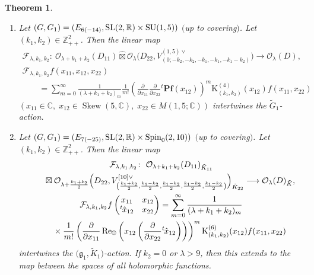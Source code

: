 \documentclass[pdftex]{sigma}
\numberwithin{equation}{section}
\newtheorem{Theorem}{Theorem}[section]
\newcommand{\BZ}{\mathbb{Z}}
\newcommand{\BR}{\mathbb{R}}
\newcommand{\BC}{\mathbb{C}}
\newcommand{\BO}{\mathbb{O}}
\newcommand{\fg}{\mathfrak{g}}
\newcommand{\cF}{\mathcal{F}}
\newcommand{\cO}{\mathcal{O}}
\newcommand{\rK}{\mathrm{K}}
\newcommand{\hboxtimes}{\mathbin{\hat{\boxtimes}}}
\newcommand{\Skew}{\operatorname{Skew}}
\renewcommand{\Re}{\operatorname{Re}}
\begin{document}
\begin{Theorem}
\begin{enumerate}
If $s''=3$ or $k_2=k_3=0$ or ``$s''=4$ and $k_1=k_2=k_3$'' or $\lambda>2s''-3$ or ``$s''=4$ and $\lambda+k_3>2s''-3$'',
then this extends to the map between the spaces of all holomorphic functions.
\item[$(6)$] Let $(G,G_1)=(E_{6(-14)}, {\rm SL}(2,\BR)\times \operatorname{SU}(1,5))$ $($up to covering$)$.
Let $(k_1,k_2)\in\BZ_{++}^2$. Then the linear map
\begin{gather*}
\cF_{\lambda,k_1,k_2}\colon \ \cO_{\lambda+k_1+k_2}(D_{11})\hboxtimes
\cO_\lambda\big(D_{22},V_{(0;-k_2,-k_2,-k_1,-k_1,-k_1-k_2)}^{(1,5)\vee}\big) \longrightarrow \cO_\lambda(D),\\
\cF_{\lambda,k_1,k_2}f(x_{11},x_{12},x_{22})\\
\qquad{} =\sum_{m=0}^\infty \frac{1}{(\lambda+k_1+k_2)_m}\frac{1}{m!}\left(\frac{\partial}{\partial x_{11}}
\frac{\partial}{\partial x_{22}}{}^t\mathbf{Pf}(x_{12})\right)^m\rK_{(k_1,k_2)}^{(4)}(x_{12})f(x_{11},x_{22})
\end{gather*}
$(x_{11}\in\BC,\; x_{12}\in\Skew(5,\BC),\; x_{22}\in M(1,5;\BC))$ intertwines the $\tilde{G}_1$-action.
\item[$(7)$] Let $(G,G_1)=(E_{7(-25)}, {\rm SL}(2,\BR)\times \operatorname{Spin}_0(2,10))$ $($up to covering$)$.
Let $(k_1,k_2)\in\BZ_{++}^2$. Then the linear map
\begin{gather*}
\cF_{\lambda,k_1,k_2}\colon \ \cO_{\lambda+k_1+k_2}(D_{11})_{\tilde{K}_{11}}\\
\qquad{} \boxtimes\cO_{\lambda+\frac{k_1+k_2}{2}}\Bigl(D_{22},
V_{\left(\frac{k_1+k_2}{2},\frac{k_1-k_2}{2},\frac{k_1-k_2}{2},\frac{k_1-k_2}{2},\frac{k_1-k_2}{2}\right)}^{[10]\vee}\Bigr)_{\tilde{K}_{22}} \longrightarrow \cO_\lambda(D)_{\tilde{K}},\\
\cF_{\lambda,k_1,k_2}f\begin{pmatrix}x_{11}&x_{12}\\{}^t\hspace{-1pt}\hat{x}_{12}&x_{22}\end{pmatrix}
=\sum_{m=0}^\infty \frac{1}{(\lambda+k_1+k_2)_m} \\
\qquad {} \times\frac{1}{m!}\left(\frac{\partial}{\partial x_{11}}
\Re_\BO\left(x_{12}\left(\frac{\partial}{\partial x_{22}}{}^t\hspace{-1pt}\hat{x}_{12}\right)\right)\right)^m
\rK_{(k_1,k_2)}^{(6)}(x_{12})f(x_{11},x_{22})
\end{gather*}
intertwines the $\big(\fg_1,\tilde{K}_1\big)$-action. If $k_2=0$ or $\lambda>9$,
then this extends to the map between the spaces of all holomorphic functions.
\end{enumerate}
\end{Theorem}
\end{document}
